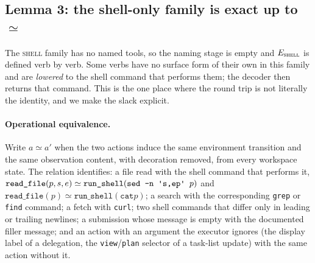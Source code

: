 \documentclass{article} %
\begin{document}
\subsection{Lemma 3: the shell-only family is exact up to $\simeq$}
\label{app:shell}

The \textsc{shell} family has no named tools, so the naming stage is empty and
$E_{\textsc{shell}}$ is defined verb by verb. Some verbs have no surface form of
their own in this family and are \emph{lowered} to the shell command that
performs them; the decoder then returns that command. This is the one place
where the round trip is not literally the identity, and we make the slack
explicit.

\paragraph{Operational equivalence.} Write $a\simeq a'$ when the two actions
induce the same environment transition and the same observation content, with
decoration removed, from every workspace state. The relation identifies:
a file read with the shell command that performs it,
$\texttt{read\_file}(p,s,e)\simeq\texttt{run\_shell}(\texttt{sed -n
\textquotesingle s,ep\textquotesingle{} }p)$ and $\texttt{read\_file}(p)\simeq\texttt{run\_shell}(\texttt{cat
}p)$; a search with the corresponding \texttt{grep} or \texttt{find}
command; a fetch with \texttt{curl}; two shell commands that differ only in
leading or trailing newlines; a submission whose message is empty with the
documented filler message; and an action with an argument the executor
ignores (the display label of a delegation, the \texttt{view}/\texttt{plan}
selector of a task-list update) with the same action without it.
\end{document}
